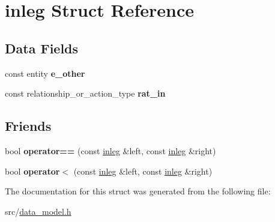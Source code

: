 \hypertarget{structinleg}{}\section{inleg Struct Reference}
\label{structinleg}
\subsection*{Data Fields}
\begin{DoxyCompactItemize}
\item 
const entity {\bfseries e\+\_\+other}\hypertarget{structinleg_aba333b51cf25d7c6ec723fe3587e1b2f}{}\label{structinleg_aba333b51cf25d7c6ec723fe3587e1b2f}

\item 
const relationship\+\_\+or\+\_\+action\+\_\+type {\bfseries rat\+\_\+in}\hypertarget{structinleg_a431e305dd15d471472f1fb9871928153}{}\label{structinleg_a431e305dd15d471472f1fb9871928153}

\end{DoxyCompactItemize}
\subsection*{Friends}
\begin{DoxyCompactItemize}
\item 
bool {\bfseries operator==} (const \hyperlink{structinleg}{inleg} \&left, const \hyperlink{structinleg}{inleg} \&right)\hypertarget{structinleg_a2882c00597e94a9fb19cde857cfe5003}{}\label{structinleg_a2882c00597e94a9fb19cde857cfe5003}

\item 
bool {\bfseries operator$<$} (const \hyperlink{structinleg}{inleg} \&left, const \hyperlink{structinleg}{inleg} \&right)\hypertarget{structinleg_a8ddd31813cdcbb1b7c88d51fcd01cd23}{}\label{structinleg_a8ddd31813cdcbb1b7c88d51fcd01cd23}

\end{DoxyCompactItemize}


The documentation for this struct was generated from the following file\+:\begin{DoxyCompactItemize}
\item 
src/\hyperlink{data__model_8h}{data\+\_\+model.\+h}\end{DoxyCompactItemize}
